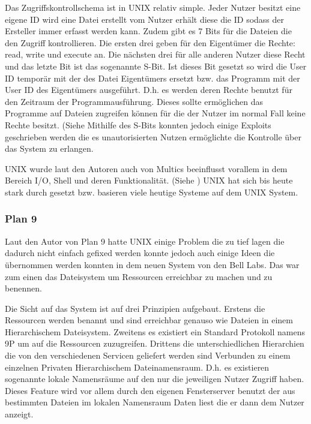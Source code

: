 \documentclass[9pt,technote]{IEEEtran}
\begin{document}
		    Das Zugriffskontrollschema ist in UNIX relativ simple. Jeder Nutzer besitzt eine eigene ID wird eine Datei erstellt
		    vom Nutzer erh\"alt diese die ID sodass der Ersteller immer
		    erfasst werden kann. Zudem gibt es 7 Bits f\"ur die Dateien die den Zugriff kontrollieren. 
		    Die ersten drei geben f\"ur den Eigent\"umer die Rechte: read, write und execute an.
		    Die n\"achsten drei f\"ur alle anderen Nutzer diese Recht und das letzte Bit ist das sogenannte S-Bit. Ist dieses Bit gesetzt so wird die User ID tempor\"ar
		    mit der des Datei Eigent\"umers ersetzt bzw. das Programm mit der User ID des Eigent\"umers ausgef\"uhrt.
		    D.h. es werden deren Rechte benutzt f\"ur den Zeitraum der Programmausf\"uhrung. Dieses sollte erm\"oglichen das Programme
		    auf Dateien zugreifen k\"onnen f\"ur die der Nutzer im normal Fall keine Rechte besitzt. (Siehe \cite[S. 367]{inproc:unix}    
		    Mithilfe des S-Bits konnten jedoch einige Exploits geschrieben werden die es unautorisierten Nutzen erm\"oglichte
		    die Kontrolle \"uber das System zu erlangen. 
		    
		    UNIX wurde laut den Autoren auch von Multics beeinflusst vorallem in dem Bereich I/O, Shell und deren Funktionalit\"at. (Siehe \cite[S. 374]{inproc:unix})
		    UNIX hat sich bis heute stark durch gesetzt bzw. basieren viele heutige Systeme auf dem UNIX System.
	    \subsubsection{Plan 9}
        Laut den Autor von Plan 9 hatte UNIX einige Problem die zu tief lagen die dadurch nicht einfach gefixed werden konnte 
        jedoch auch einige Ideen die \"ubernommen werden konnten
        in dem neuen System von den Bell Labs. Das war zum einen das Dateisystem um Ressourcen erreichbar zu machen und zu benennen.
    
        Die Sicht auf das System ist auf drei Prinzipien aufgebaut.
        Erstens die Ressourcen werden benannt und sind erreichbar genauso wie Dateien in einem Hierarchischem Dateisystem. 
        Zweitens es existiert ein Standard Protokoll namens 9P um auf die 
        Ressourcen zuzugreifen. Drittens die unterschiedlichen Hierarchien die von den verschiedenen Servicen geliefert
        werden sind Verbunden zu einem einzelnen Privaten
        Hierarchischem Dateinamensraum. D.h. es existieren sogenannte lokale Namensr\"aume auf den nur die jeweiligen Nutzer Zugriff haben.
        Dieses Feature wird vor allem durch den eigenen Fensterserver benutzt der aus bestimmten Dateien im lokalen 
        Namensraum Daten liest die er dann dem Nutzer anzeigt.
        
\end{document}
